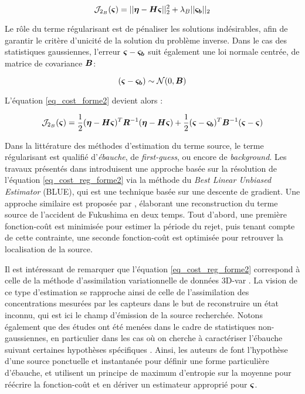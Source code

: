  \begin{equation}
 \mathcal{J}_{2_B}({\bm{\varsigma}}) = ||{\bm{\eta}} - {\bm{H}} {\bm{\varsigma}}||_2^2 + \lambda_B ||{\bm{\varsigma_b}}||_2
 \label{eq_cost_MCO_reg}
 \end{equation}
 
 Le rôle du terme régularisant est de pénaliser les solutions indésirables, afin de garantir le critère d'unicité de la solution du problème inverse.  Dans le cas des statistiques gaussiennes, l'erreur  ${\bm{\varsigma}} - {\bm{\varsigma_b}}$ suit également une loi normale centrée, de matrice de covariance ${\bm{B}}$:
  
  \begin{equation}
  ({\bm{\varsigma}} - {\bm{\varsigma_b}}) \sim \mathcal{N}(0,{\bm{B}})
  \label{eq_erreur_ebauche}
  \end{equation}
  
  L'équation \eqref{eq_cost_forme2} devient alors \cite{Winiarek2011}: 
 
\begin{equation}
\mathcal{J}_{2_B}({\bm{\varsigma}}) = \dfrac{1}{2}({\bm{\eta}} - {\bm{H}} {\bm{\varsigma}})^T {\bm{R}}^{-1}({\bm{\eta}} - {\bm{H}}{\bm{\varsigma}}) + \dfrac{1}{2}({\bm{\varsigma}} - {\bm{\varsigma_b}})^T{\bm{B}}^{-1}({\bm{\varsigma}} - {\bm{\varsigma}})
\label{eq_cost_reg_forme2}
\end{equation}

Dans la littérature des méthodes d'estimation du terme source, le terme régularisant est qualifié d'\textit{ébauche}, de \textit{first-guess}, ou encore de \textit{background}. Les travaux présentés dans \cite{Winiarek2012} introduisent une approche basée sur la résolution de l'équation \eqref{eq_cost_reg_forme2} via la méthode du \textit{Best Linear Unbiased Estimator} (BLUE), qui est une technique basée sur une descente de gradient. Une approche similaire est proposée par \cite{Saunier2013}, élaborant une reconstruction du terme source de l'accident de Fukushima en deux temps. Tout d'abord, une première fonction-coût est minimisée pour estimer la période du rejet, puis tenant compte de cette contrainte, une seconde fonction-coût est optimisée pour retrouver la localisation de la source. 

Il est intéressant de remarquer que l'équation \eqref{eq_cost_reg_forme2} correspond à celle de la méthode d'assimilation variationnelle de données 3D-var \cite{Courtier1998}. La vision de ce type d'estimation se rapproche ainsi de celle de l'assimilation des concentrations mesurées par les capteurs dans le but de reconstruire un état inconnu, qui est ici le champ d'émission de la source recherchée. Notons également que des études ont été menées dans le cadre de statistiques non-gaussiennes, en particulier dans les cas où on cherche à caractériser l'ébauche suivant certaines hypothèses spécifiques \cite{Bocquet2005a}. Ainsi, les auteurs de \cite{Krysta2007} font l'hypothèse d'une source ponctuelle et instantanée pour définir une forme particulière d'ébauche, et utilisent un principe de maximum d'entropie sur la moyenne \cite{Jaynes1957} pour réécrire la fonction-coût et en dériver un estimateur approprié pour ${\bm{\varsigma}}$.\\

